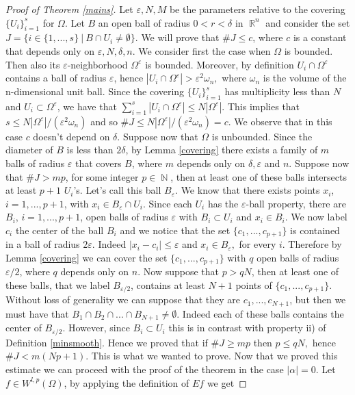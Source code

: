 \documentclass[12pt]{article}
\theoremstyle{definition}
\DeclareMathOperator\rr{\mathbb{R}}
\DeclareMathOperator\nn{\mathbb{N}}
\begin{document}
\begin{proof}[Proof of Theorem \ref{mains}]
Let  $\varepsilon,N,M$ be the parameters relative to the covering $\{ U_i\}_{i=1}^s$ for $\Omega$. Let $B$ an open ball of radius $0<r<\delta$ in $\rr^n$ and consider the set $J=\{i \in \{1,...,s\} \ | \ B\cap U_i \neq \emptyset\}$. We will prove that $\#J\le c$, where $c$ is a constant that depends only on $\varepsilon,N,\delta,n.$ We consider first the case when $\Omega$ is bounded. Then also its $\varepsilon$-neighborhood $\Omega^\varepsilon $ is bounded. Moreover, by definition $U_i\cap \Omega^\varepsilon$ contains a ball of radius $\varepsilon$, hence $|U_i\cap \Omega^\varepsilon|>\varepsilon^2\omega_n,$ where $\omega_n$ is the volume of the n-dimensional unit ball. Since the covering $\{U_i\}_{i=1}^s$ has multiplicity less than $N$ and $U_i\subset\Omega^\varepsilon$, we have that $\sum_{i=1}^s|U_i\cap \Omega^\varepsilon|\le N |\Omega^\varepsilon|$. This implies that $s\le N |\Omega^\varepsilon|/(\varepsilon^2\omega_n)$ and so $\#J\le N |\Omega^\varepsilon|/(\varepsilon^2\omega_n)=c.$ We observe that in this case $c$ doesn't depend on $\delta.$ Suppose now that $\Omega$ is unbounded. Since the diameter of $B$ is less than $2\delta$, by Lemma \ref{covering} there exists a family of $m$ balls of radius $\varepsilon$ that covers $B$, where $m$ depends only on $\delta,\varepsilon$ and $n$. Suppose now that $\#J>mp$, for some integer $p\in \nn$, then at least one of these balls intersects at least $p+1$  $U_i$'s. Let's call this ball $B_\varepsilon.$ We know that there exists points $x_i$, $i=1,...,p+1$, with $x_i \in B_\varepsilon \cap U_i.$ Since each $U_i$ has the $\varepsilon$-ball property, there are $B_i$, $i=1,...,p+1$, open balls of radius $\varepsilon$ with $B_i \subset U_i$ and $x_i \in B_i.$ We now label $c_i$ the center of the ball $B_i$ and we notice that the set $\{c_1,...,c_{p+1}\}$ is contained in a ball of radius $2\varepsilon.$ Indeed $|x_i-c_i|\le \varepsilon$ and $x_i \in B_\varepsilon,$ for every $i.$ Therefore by Lemma \ref{covering} we can cover the set $\{c_1,...,c_{p+1}\}$ with $q$ open balls of radius $\varepsilon/2$, where $q$ depends only on $n.$ Now suppose that $p>qN$, then at least one of these balls, that we label $B_{\varepsilon/2}$, contains at least $N+1$ points of $\{c_1,...,c_{p+1}\}.$ Without loss of generality we can suppose that they are $c_1,...,c_{N+1}$, but then we must have that $B_1\cap B_2 \cap ... \cap B_{N+1}\neq \emptyset$. Indeed each of these balls contains the center of $B_{\varepsilon/2}.$ However, since $B_i \subset U_i$ this is in contrast with property ii) of Definition \ref{minsmooth}. Hence we proved that if $\#J\ge mp$ then $p\le qN,$ hence $\#J<m(Np+1) $. This is what we wanted to prove. Now that we proved this estimate we can proceed with the proof of the theorem in the case $|\alpha|=0.$ Let $f \in W^{l,p}(\Omega)$, by applying the definition of $Ef$ we get


\end{proof}
\end{document}
